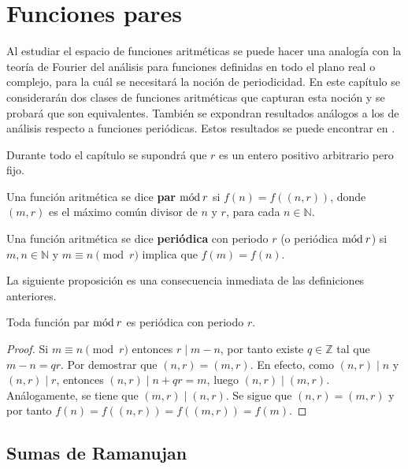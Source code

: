 \newpage
\section{Funciones pares}

Al estudiar el espacio de funciones aritméticas se puede hacer una analogía con la teoría de Fourier del análisis para funciones definidas en todo el plano real o complejo, para la cuál se necesitará la noción de periodicidad. En este capítulo se considerarán dos clases de funciones aritméticas que capturan esta noción y se probará que son equivalentes. También se expondran resultados análogos a los de análisis respecto a funciones periódicas. Estos  resultados se puede encontrar en \cite{Coh1}.

\begin{remark}
Durante todo el capítulo se supondrá que $r$ es un entero positivo arbitrario pero fijo.
\end{remark}

\begin{definition}
Una función aritmética se dice \textbf{par} $\mathrm{m\acute{o}d\:}r$ si $f(n)=f((n,r))$, donde $(m,r)$ es el máximo común divisor de $n$ y $r$, para cada $n \in \mathbb{N}$.
\end{definition}

\begin{definition}
Una función aritmética se dice \textbf{periódica} con periodo $r$ (o periódica $\mathrm{m\acute{o}d\:}r$) si $m, n \in \mathbb{N}$ y $m \equiv n \pmod{r}$ implica que $f(m)=f(n)$.
\end{definition}

La siguiente proposición es una consecuencia inmediata de las definiciones anteriores.

\begin{proposition}
Toda función par $\mathrm{m\acute{o}d\:}r$ es periódica con periodo $r$.
\end{proposition}
\begin{proof}
Si $m \equiv n \pmod{r}$ entonces $r \mid m-n$, por tanto existe $q \in \mathbb{Z}$ tal que $m-n=q r$. Por demostrar que $(n,r)=(m,r)$. En efecto, como $(n,r) \mid n$ y $(n,r) \mid r$, entonces $(n,r) \mid n+qr=m$, luego $(n,r) \mid (m,r)$. Análogamente, se tiene que $(m,r) \mid (n,r)$. Se sigue que $(n,r)=(m,r)$ y por tanto $f(n)=f((n,r))=f((m,r))=f(m)$.
\end{proof}

\subsection{Sumas de Ramanujan}

